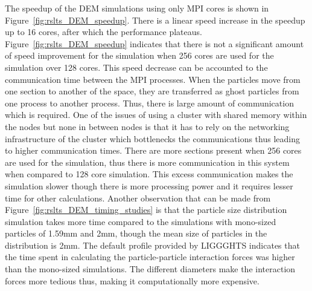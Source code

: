 \documentclass[preprint,11pt,authoryear]{elsarticle}
\begin{document}
The speedup of the DEM simulations using only MPI cores is shown in Figure~\ref{fig:rslts_DEM_speedup}.
There is a linear speed increase in the speedup up to 16 cores, after which the 
performance plateaus.
Figure~\ref{fig:rslts_DEM_speedup} indicates that there 
is not a significant amount of speed improvement for the simulation when 256 cores are used for the 
simulation over 128 cores. This speed decrease can be accounted to the communication time between 
the MPI processes. When the particles move from one section to another of the space, they are 
transferred as ghost particles from one process to another process. Thus, there is large amount of 
communication which is required. One of the issues of using a cluster with shared memory within 
the nodes but none in between nodes is that it has to rely on the networking infrastructure 
of the cluster which bottlenecks the communications thus leading to higher communication times. 
There are more sections present when 256 cores are used for the simulation, thus there is more 
communication in this system when compared to 128 core simulation. 
This excess communication makes the simulation slower though there is more processing power and 
it requires lesser time for other calculations. Another observation that can be made from Figure~\ref{fig:rslts_DEM_timing_studies} is that the particle size distribution simulation takes more time 
compared to the simulations with mono-sized particles of 1.59mm and 2mm, though the mean size of 
particles in the distribution is 2mm. The default profile provided by LIGGGHTS indicates that the time 
spent in calculating the particle-particle interaction forces was higher than the mono-sized 
simulations. The different diameters make the interaction forces more tedious thus, making it 
computationally more expensive. 
\end{document}
